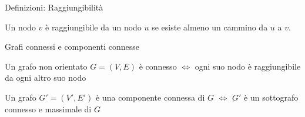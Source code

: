 \begin{frame}{Definizioni: Raggiungibilità}

\vspace{-6pt}
\begin{myboxtitle}[Definizione]
Un nodo $v$ è \alert{raggiungibile} da un nodo $u$ se esiste almeno un cammino da $u$ a $v$.
\end{myboxtitle}

\end{frame}



\begin{frame}{Grafi connessi e componenti connesse}

\vspace{-6pt}
\begin{myboxtitle}[Definizioni]
\BIL
\item Un grafo non orientato $G=(V,E)$ è \alert{connesso} $\Leftrightarrow$ ogni
suo nodo è raggiungibile da ogni altro suo nodo
\item Un grafo $G'=(V',E')$ è una \alert{componente connessa} di $G$ $\Leftrightarrow$ $G'$ è un sottografo connesso e massimale di $G$
\EIL

\end{myboxtitle}


\end{frame}

